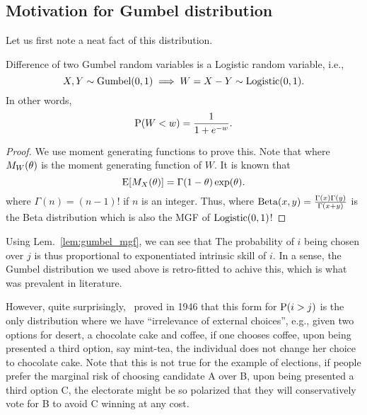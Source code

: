 \documentclass[letterpaper, 12pt, reqno]{amsart}
\begin{document}
\subsection{Motivation for Gumbel distribution}
Let us first note a neat fact of this distribution.
\begin{lemma}
\label{lem:gumbel_mgf}
Difference of two Gumbel random variables is a Logistic random variable, i.e.,
$$
X, Y \sim \gumbel(0,1) \implies W = X-Y \sim \logistic(0,1).
$$
In other words,
$$
\P(W < w) = \f{1}{1+e^{-w}}.
$$
\end{lemma}
\begin{proof}
We use moment generating functions to prove this. Note that
where $M_W(\th)$ is the moment generating function of $W$. It is known that
$$
\E[M_X(\th)] = \Gamma(1-\th) \exp(\th).
$$
where $\Gamma(n) = (n-1)!$ if $n$ is an integer.
Thus,
where $\trm{Beta}(x,y) = \f{\Gamma(x) \Gamma(y)}{\Gamma(x+y)}$ is the Beta distribution which is also the MGF of $\logistic(0,1)$!
\end{proof}

Using Lem.~\ref{lem:gumbel_mgf}, we can see that
The probability of $i$ being chosen over $j$ is thus proportional to exponentiated intrinsic skill of $i$. In a sense, the Gumbel distribution we used above is retro-fitted to achive this, which is what was prevalent in literature.

However, quite surprisingly,~\cite{luce2012individual} proved in 1946 that this form for $\P(i > j)$ is the only distribution where we have ``irrelevance of external choices'', e.g., given two options for desert, a chocolate cake and coffee, if one chooses coffee, upon being presented a third option, say mint-tea, the individual does not change her choice to chocolate cake. Note that this is not true for the example of elections, if people prefer the marginal risk of choosing candidate A over B, upon being presented a third option C, the electorate might be so polarized that they will conservatively vote for B to avoid C winning at any cost.
\end{document}
